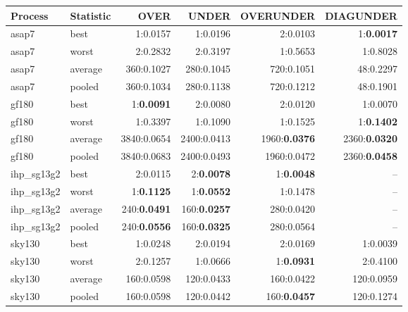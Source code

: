 \small
\begin{tabular}{llrrrr}\toprule
Process & Statistic & OVER & UNDER & OVERUNDER & DIAGUNDER \\\midrule
asap7 & best & 1:0.0157 & 1:0.0196 & 2:0.0103 & 1:\textbf{0.0017} \\
asap7 & worst & 2:0.2832 & 2:0.3197 & 1:0.5653 & 1:0.8028 \\
asap7 & average & 360:0.1027 & 280:0.1045 & 720:0.1051 & 48:0.2297 \\
asap7 & pooled & 360:0.1034 & 280:0.1138 & 720:0.1212 & 48:0.1901 \\
\addlinespace
gf180 & best & 1:\textbf{0.0091} & 2:0.0080 & 2:0.0120 & 1:0.0070 \\
gf180 & worst & 1:0.3397 & 1:0.1090 & 1:0.1525 & 1:\textbf{0.1402} \\
gf180 & average & 3840:0.0654 & 2400:0.0413 & 1960:\textbf{0.0376} & 2360:\textbf{0.0320} \\
gf180 & pooled & 3840:0.0683 & 2400:0.0493 & 1960:0.0472 & 2360:\textbf{0.0458} \\
\addlinespace
ihp\_sg13g2 & best & 2:0.0115 & 2:\textbf{0.0078} & 1:\textbf{0.0048} & -- \\
ihp\_sg13g2 & worst & 1:\textbf{0.1125} & 1:\textbf{0.0552} & 1:0.1478 & -- \\
ihp\_sg13g2 & average & 240:\textbf{0.0491} & 160:\textbf{0.0257} & 280:0.0420 & -- \\
ihp\_sg13g2 & pooled & 240:\textbf{0.0556} & 160:\textbf{0.0325} & 280:0.0564 & -- \\
\addlinespace
sky130 & best & 1:0.0248 & 2:0.0194 & 2:0.0169 & 1:0.0039 \\
sky130 & worst & 2:0.1257 & 1:0.0666 & 1:\textbf{0.0931} & 2:0.4100 \\
sky130 & average & 160:0.0598 & 120:0.0433 & 160:0.0422 & 120:0.0959 \\
sky130 & pooled & 160:0.0598 & 120:0.0442 & 160:\textbf{0.0457} & 120:0.1274 \\
\bottomrule\end{tabular}
